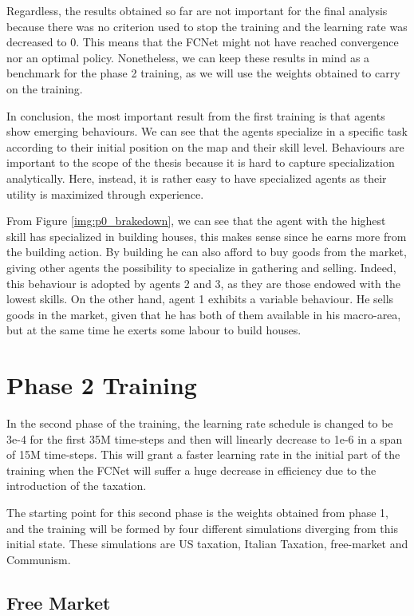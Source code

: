 Regardless, the results obtained so far are not important for the final analysis because there was no criterion used to stop the training and the learning rate was decreased to 0. This means that the FCNet might not have reached convergence nor an optimal policy. Nonetheless, we can keep these results in mind as a benchmark for the phase 2 training, as we will use the weights obtained to carry on the training.

In conclusion, the most important result from the first training is that agents show emerging behaviours. We can see that the agents specialize in a specific task according to their initial position on the map and their skill level. Behaviours are important to the scope of the thesis because it is hard to capture specialization analytically. Here, instead, it is rather easy to have specialized agents as their utility is maximized through experience.

From Figure \ref{img:p0_brakedown}, we can see that the agent with the highest skill has specialized in building houses, this makes sense since he earns more from the building action. By building he can also afford to buy goods from the market, giving other agents the possibility to specialize in gathering and selling. Indeed, this behaviour is adopted by agents 2 and 3, as they are those endowed with the lowest skills. On the other hand, agent 1 exhibits a variable behaviour. He sells goods in the market, given that he has both of them available in his macro-area, but at the same time he exerts some labour to build houses.

\section{Phase 2 Training}

  
In the second phase of the training, the learning rate schedule is changed to be 3e-4 for the first 35M time-steps and then will linearly decrease to 1e-6 in a span of 15M time-steps. This will grant a faster learning rate in the initial part of the training when the FCNet will suffer a huge decrease in efficiency due to the introduction of the taxation. 

The starting point for this second phase is the weights obtained from phase 1, and the training will be formed by four different simulations diverging from this initial state. These simulations are US taxation, Italian Taxation, free-market and Communism.

\subsection{Free Market}

